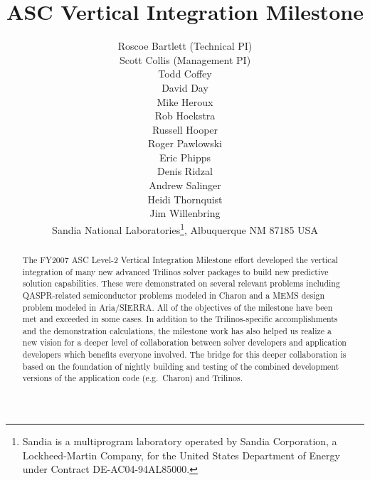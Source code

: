 \documentclass[pdf,ps2pdf,11pt]{SANDreport}
\title{\center
ASC Vertical Integration Milestone
}
\author{
Roscoe Bartlett (Technical PI) \\
Scott Collis (Management PI) \\
Todd Coffey \\
David Day \\
Mike Heroux \\
Rob Hoekstra \\
Russell Hooper \\
Roger Pawlowski \\
Eric Phipps \\
Denis Ridzal \\
Andrew Salinger \\
Heidi Thornquist \\
Jim Willenbring \\
Sandia National
Laboratories\footnote{ Sandia is a multiprogram laboratory operated by Sandia
Corporation, a Lockheed-Martin Company, for the United States Department of
Energy under Contract DE-AC04-94AL85000.}, Albuquerque NM 87185 USA
}
\begin{document}
\maketitle

%


%
\begin{abstract}
%

The FY2007 ASC Level-2 Vertical Integration Milestone effort developed the
vertical integration of many new advanced Trilinos solver packages to build
new predictive solution capabilities.  These were demonstrated on several
relevant problems including QASPR-related semiconductor problems modeled in
Charon and a MEMS design problem modeled in Aria/SIERRA.  All of the objectives of the
milestone have been met and exceeded in some cases.  In addition to the
Trilinos-specific accomplishments and the demonstration calculations, the
milestone work has also helped us realize a new vision for a deeper level of
collaboration between solver developers and application developers which
benefits everyone involved.  The bridge for this deeper collaboration is based
on the foundation of nightly building and testing of the combined development versions
of the application code (e.g.\ Charon) and Trilinos.

%

%
\end{abstract}
%

%
%
%
\end{document}
